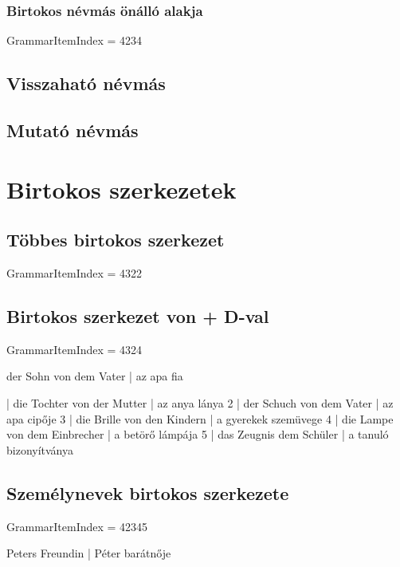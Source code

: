 \documentclass{article}
\newenvironment{desc}{\verbatim}{\endverbatim}
\newenvironment{exmp}{\verbatim}{\endverbatim}
\begin{document}
\subsubsection{Birtokos névmás önálló alakja}

GrammarItemIndex = 4234

\subsection{Visszaható névmás}

\subsection{Mutató névmás}

\section{Birtokos szerkezetek}

\subsection{Többes birtokos szerkezet}

GrammarItemIndex = 4322

\subsection{Birtokos szerkezet von + D-val}

GrammarItemIndex = 4324

\begin{desc}
der Sohn von dem Vater | az apa fia
\end{desc}

\begin{exmp}
1 | die Tochter von der Mutter | az anya lánya
2 | der Schuch von dem Vater | az apa cipője
3 | die Brille von den Kindern | a gyerekek szemüvege
4 | die Lampe von dem Einbrecher | a betörő lámpája
5 | das Zeugnis dem  Schüler | a tanuló bizonyítványa
\end{exmp}

\subsection{Személynevek birtokos szerkezete}

GrammarItemIndex = 42345

\begin{desc}
Peters Freundin | Péter barátnője
\end{desc}
\end{document}
